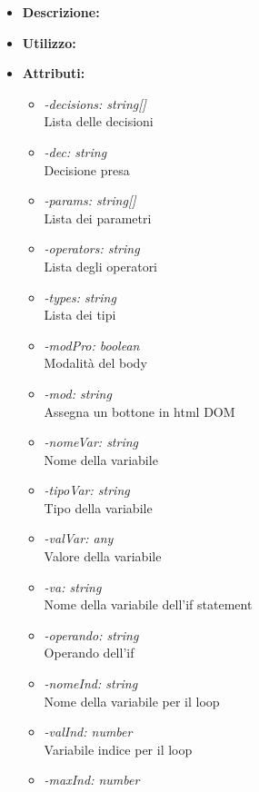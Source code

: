 \begin{itemize}
	
	\item \textbf{Descrizione:}\\
	
	\item \textbf{Utilizzo:}\\
	
	\item \textbf{Attributi:}
		\begin{itemize}
			\item \emph{-decisions: string[]}\\
			Lista delle decisioni
			\item \emph{-dec: string}\\
			Decisione presa
			\item \emph{-params: string[]}\\
			Lista dei parametri
			\item \emph{-operators: string}\\
			Lista degli operatori
			\item \emph{-types: string}\\
			Lista dei tipi
			\item \emph{-modPro: boolean}\\
			Modalità del body
			\item \emph{-mod: string}\\
			Assegna un bottone in html DOM
			\item \emph{-nomeVar: string}\\
			Nome della variabile
			\item \emph{-tipoVar: string}\\
			Tipo della variabile
			\item \emph{-valVar: any}\\
			Valore della variabile
			\item \emph{-va: string}\\
			Nome della variabile dell'if statement
			\item \emph{-operando: string}\\
			Operando dell'if
			\item \emph{-nomeInd: string}\\
			Nome della variabile per il loop
			\item \emph{-valInd: number}\\
			Variabile indice per il loop
			\item \emph{-maxInd: number}\\

\end{itemize}
\end{itemize}
